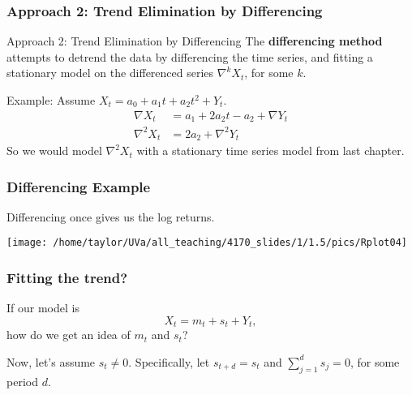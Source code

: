 \documentclass{beamer}
\begin{document}

\begin{frame}
\frametitle{Approach 2: Trend Elimination by Differencing}


\begin{block}{Approach 2: Trend Elimination by Differencing}
The {\bf differencing method} attempts to detrend the data by differencing the time series, and fitting a stationary model on the differenced series $\nabla^k X_t$, for some $k$.
\end{block}

Example: Assume $X_t = a_0 + a_1 t + a_2 t^2 + Y_t$. 
\begin{align*}
\nabla X_t &= a_1 + 2 a_2 t - a_2 + \nabla Y_t \\
\nabla^2 X_t &= 2 a_2 + \nabla^2 Y_t
\end{align*}
So we would model $\nabla^2 X_t$ with a stationary time series model from last chapter.
\end{frame}



\begin{frame}
\frametitle{Differencing Example}

Differencing once gives us the log returns.

\begin{center}
\texttt{[image: /home/taylor/UVa/all\_teaching/4170\_slides/1/1.5/pics/Rplot04]}
\end{center}

\end{frame}


\begin{frame}
\frametitle{Fitting the trend?}

If our model is 
\[
X_t = m_t + s_t + Y_t,
\]
how do we get an idea of $m_t$ and $s_t$?
\newline

Now, let's assume $s_t \neq 0$. Specifically, let $s_{t+d} = s_t$ and $\sum_{j=1}^d s_j = 0$, for some period $d$.
\end{frame}

\end{document}

